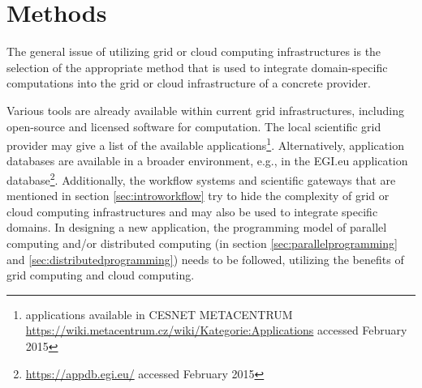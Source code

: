 \chapter{Methods}
\label{sec:methods}



The general issue of utilizing grid or cloud computing infrastructures is the selection of the appropriate method that is used to integrate domain-specific computations into the grid or cloud infrastructure of a concrete provider. 

Various tools are already available within current grid infrastructures, including open-source and licensed software for computation. The local scientific grid provider may give a list of the available applications\footnote{applications available in CESNET METACENTRUM \url{https://wiki.metacentrum.cz/wiki/Kategorie:Applications} accessed February 2015}. Alternatively, application databases are available in a broader environment, e.g., in the EGI.eu application database\footnote{\url{https://appdb.egi.eu/} accessed February 2015}.
Additionally, the workflow systems and scientific gateways that are mentioned in section \ref{sec:introworkflow} try to hide the complexity of grid or cloud computing infrastructures and may also be used to integrate specific domains.
In designing a new application, the programming model of parallel computing and/or distributed  computing (in section \ref{sec:parallelprogramming} and  \ref{sec:distributedprogramming}) needs to be followed, utilizing the benefits of grid computing and cloud computing.

